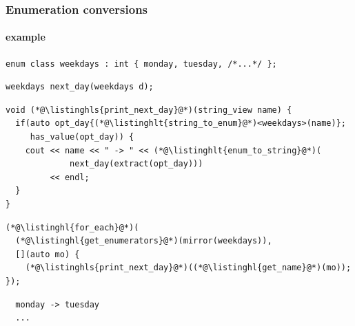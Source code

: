 \documentclass[compress,table,xcolor=table]{beamer}
\begin{document}
\begin{frame}[fragile]
  \frametitle{Enumeration conversions}
  \framesubtitle{example}
  \begin{lstlisting}[language=c++2x,basicstyle=\scriptsize\ttfamily]
enum class weekdays : int { monday, tuesday, /*...*/ };
  \end{lstlisting}
  \begin{lstlisting}[language=c++2x,basicstyle=\scriptsize\ttfamily]
weekdays next_day(weekdays d);
  \end{lstlisting}
  \begin{lstlisting}[language=c++2x,basicstyle=\footnotesize\ttfamily]
void (*@\listinghls{print_next_day}@*)(string_view name) {
  if(auto opt_day{(*@\listinghlt{string_to_enum}@*)<weekdays>(name)};
     has_value(opt_day)) {
    cout << name << " -> " << (*@\listinghlt{enum_to_string}@*)(
             next_day(extract(opt_day)))
         << endl;
  }
}
  \end{lstlisting}
  \begin{lstlisting}[language=c++2x,basicstyle=\scriptsize\ttfamily]
(*@\listinghl{for_each}@*)(
  (*@\listinghl{get_enumerators}@*)(mirror(weekdays)),
  [](auto mo) {
    (*@\listinghls{print_next_day}@*)((*@\listinghl{get_name}@*)(mo));
});
  \end{lstlisting}
  \smaller
  \begin{verbatim}
  monday -> tuesday
  ...
  \end{verbatim}
\end{frame}
\end{document}
